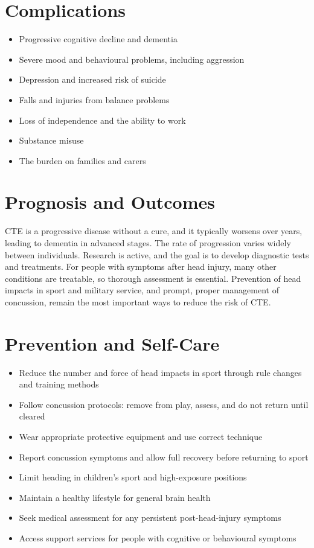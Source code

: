 \section*{Complications}
\begin{itemize}
    \item Progressive cognitive decline and dementia
    \item Severe mood and behavioural problems, including aggression
    \item Depression and increased risk of suicide
    \item Falls and injuries from balance problems
    \item Loss of independence and the ability to work
    \item Substance misuse
    \item The burden on families and carers
\end{itemize}

\section*{Prognosis and Outcomes}
CTE is a progressive disease without a cure, and it typically worsens over years, leading to dementia in advanced stages. The rate of progression varies widely between individuals. Research is active, and the goal is to develop diagnostic tests and treatments. For people with symptoms after head injury, many other conditions are treatable, so thorough assessment is essential. Prevention of head impacts in sport and military service, and prompt, proper management of concussion, remain the most important ways to reduce the risk of CTE.

\section*{Prevention and Self-Care}
\begin{itemize}
    \item Reduce the number and force of head impacts in sport through rule changes and training methods
    \item Follow concussion protocols: remove from play, assess, and do not return until cleared
    \item Wear appropriate protective equipment and use correct technique
    \item Report concussion symptoms and allow full recovery before returning to sport
    \item Limit heading in children's sport and high-exposure positions
    \item Maintain a healthy lifestyle for general brain health
    \item Seek medical assessment for any persistent post-head-injury symptoms
    \item Access support services for people with cognitive or behavioural symptoms
\end{itemize}

